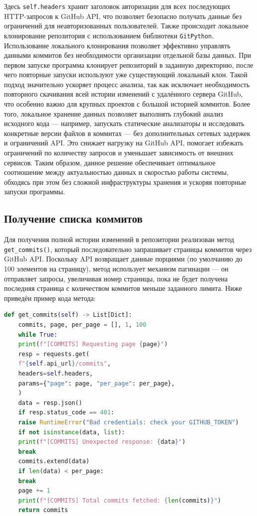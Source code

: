 Здесь \verb|self.headers| хранит заголовок авторизации для всех последующих HTTP-запросов к GitHub API, что позволяет безопасно получать данные без ограничений для неавторизованных пользователей. Также происходит локальное клонирование репозитория с использованием библиотеки \texttt{GitPython}. Использование локального клонирования позволяет эффективно управлять данными коммитов без необходимости организации отдельной базы данных. При первом запуске программа клонирует репозиторий в заданную директорию, после чего повторные запуски используют уже существующий локальный клон. Такой подход значительно ускоряет процесс анализа, так как исключает необходимость повторного скачивания всей истории изменений с удалённого сервера GitHub, что особенно важно для крупных проектов с большой историей коммитов. Более того, локальное хранение данных позволяет выполнять глубокий анализ исходного кода — например, запускать статические анализаторы и исследовать конкретные версии файлов в коммитах — без дополнительных сетевых задержек и ограничений API. Это снижает нагрузку на GitHub API, помогает избежать ограничений по количеству запросов и уменьшает зависимость от внешних сервисов. Таким образом, данное решение обеспечивает оптимальное соотношение между актуальностью данных и скоростью работы системы, обходясь при этом без сложной инфраструктуры хранения и ускоряя повторные запуски программы.


\subsection{Получение списка коммитов}

Для получения полной истории изменений в репозитории реализован метод \verb|get_commits()|, который последовательно запрашивает страницы коммитов через GitHub API. Поскольку API возвращает данные порциями (по умолчанию до 100 элементов на страницу), метод использует механизм пагинации — он отправляет запросы, увеличивая номер страницы, пока не будет получена последняя страница с количеством коммитов меньше заданного лимита. Ниже приведён пример кода метода:

\begin{lstlisting}[language=Python, caption={{Получение списка коммитов в методе \texttt{get\_commits}}}]
	def get_commits(self) -> List[Dict]:
	commits, page, per_page = [], 1, 100
	while True:
	print(f"[COMMITS] Requesting page {page}")
	resp = requests.get(
	f"{self.api_url}/commits",
	headers=self.headers,
	params={"page": page, "per_page": per_page},
	)
	data = resp.json()
	if resp.status_code == 401:
	raise RuntimeError("Bad credentials: check your GITHUB_TOKEN")
	if not isinstance(data, list):
	print(f"[COMMITS] Unexpected response: {data}")
	break
	commits.extend(data)
	if len(data) < per_page:
	break
	page += 1
	print(f"[COMMITS] Total commits fetched: {len(commits)}")
	return commits
\end{lstlisting}

